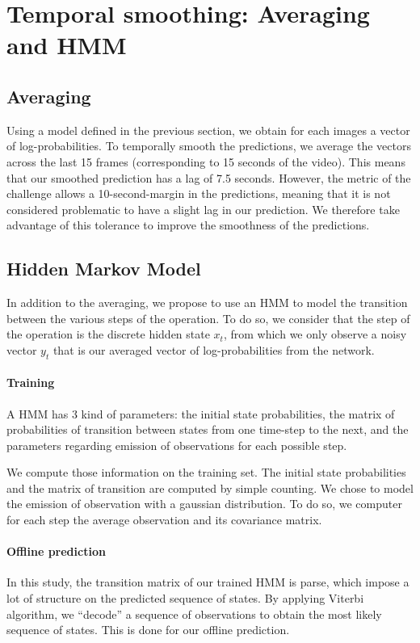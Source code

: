 \documentclass[10pt,twocolumn,letterpaper]{article}
\begin{document}
\section{Temporal smoothing: Averaging and HMM}

\subsection{Averaging}

Using a model defined in the previous section, we obtain for each images a vector of log-probabilities.
To temporally smooth the predictions, we average the vectors across the
last 15 frames (corresponding to 15 seconds of the video). This means that our
smoothed prediction has a lag of 7.5 seconds. However, the metric of the challenge
allows a 10-second-margin in the predictions, meaning that it is not considered
problematic to have a slight lag in our prediction. We therefore take advantage
of this tolerance to improve the smoothness of the predictions.

\subsection{Hidden Markov Model}

In addition to the averaging, we propose to use an HMM to model the transition
between the various steps of the operation. To do so, we consider that the step of the operation is the discrete hidden state $x_t$,
from which we only observe a noisy vector $y_t$ that is our averaged vector of log-probabilities from
the network.

\paragraph{Training} A HMM has 3 kind of parameters: the initial state probabilities, the matrix of probabilities
of transition between states from one time-step to the next, and the parameters
regarding emission of observations for each possible step.

We compute those information on the training set. The initial state probabilities and the matrix of transition are computed by simple counting. We chose to model the emission of
observation with a gaussian distribution. To do so, we computer for each step the average observation and its covariance matrix.

\paragraph{Offline prediction} In this study, the transition matrix of our trained HMM is parse, which impose a lot of structure on the predicted sequence of states. By applying Viterbi algorithm, we ``decode'' a sequence of observations to obtain the most likely sequence of states. This is done for our offline prediction.
\end{document}
